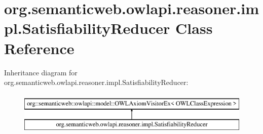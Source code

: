 \hypertarget{classorg_1_1semanticweb_1_1owlapi_1_1reasoner_1_1impl_1_1_satisfiability_reducer}{\section{org.\-semanticweb.\-owlapi.\-reasoner.\-impl.\-Satisfiability\-Reducer Class Reference}
\label{classorg_1_1semanticweb_1_1owlapi_1_1reasoner_1_1impl_1_1_satisfiability_reducer}
}
Inheritance diagram for org.\-semanticweb.\-owlapi.\-reasoner.\-impl.\-Satisfiability\-Reducer\-:\begin{figure}[H]
\begin{center}
\leavevmode
\includegraphics[height=2.000000cm]{classorg_1_1semanticweb_1_1owlapi_1_1reasoner_1_1impl_1_1_satisfiability_reducer}
\end{center}
\end{figure}

